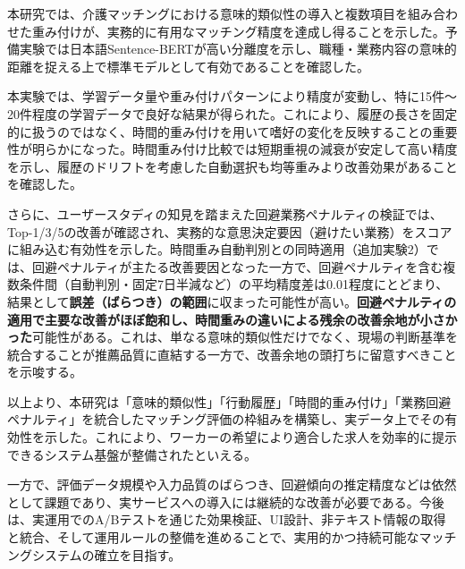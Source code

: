 本研究では、介護マッチングにおける意味的類似性の導入と複数項目を組み合わせた重み付けが、実務的に有用なマッチング精度を達成し得ることを示した。予備実験では日本語Sentence-BERTが高い分離度を示し、職種・業務内容の意味的距離を捉える上で標準モデルとして有効であることを確認した。

本実験では、学習データ量や重み付けパターンにより精度が変動し、特に15件〜20件程度の学習データで良好な結果が得られた。これにより、履歴の長さを固定的に扱うのではなく、時間的重み付けを用いて嗜好の変化を反映することの重要性が明らかになった。時間重み付け比較では短期重視の減衰が安定して高い精度を示し、履歴のドリフトを考慮した自動選択も均等重みより改善効果があることを確認した。

さらに、ユーザースタディの知見を踏まえた回避業務ペナルティの検証では、Top-1/3/5の改善が確認され、実務的な意思決定要因（避けたい業務）をスコアに組み込む有効性を示した。時間重み自動判別との同時適用（追加実験2）では、回避ペナルティが主たる改善要因となった一方で、回避ペナルティを含む複数条件間（自動判別・固定7日半減など）の平均精度差は0.01程度にとどまり、結果として\textbf{誤差（ばらつき）の範囲}に収まった可能性が高い。\textbf{回避ペナルティの適用で主要な改善がほぼ飽和し、時間重みの違いによる残余の改善余地が小さかった}可能性がある。これは、単なる意味的類似性だけでなく、現場の判断基準を統合することが推薦品質に直結する一方で、改善余地の頭打ちに留意すべきことを示唆する。

以上より、本研究は「意味的類似性」「行動履歴」「時間的重み付け」「業務回避ペナルティ」を統合したマッチング評価の枠組みを構築し、実データ上でその有効性を示した。これにより、ワーカーの希望により適合した求人を効率的に提示できるシステム基盤が整備されたといえる。

一方で、評価データ規模や入力品質のばらつき、回避傾向の推定精度などは依然として課題であり、実サービスへの導入には継続的な改善が必要である。今後は、実運用でのA/Bテストを通じた効果検証、UI設計、非テキスト情報の取得と統合、そして運用ルールの整備を進めることで、実用的かつ持続可能なマッチングシステムの確立を目指す。
